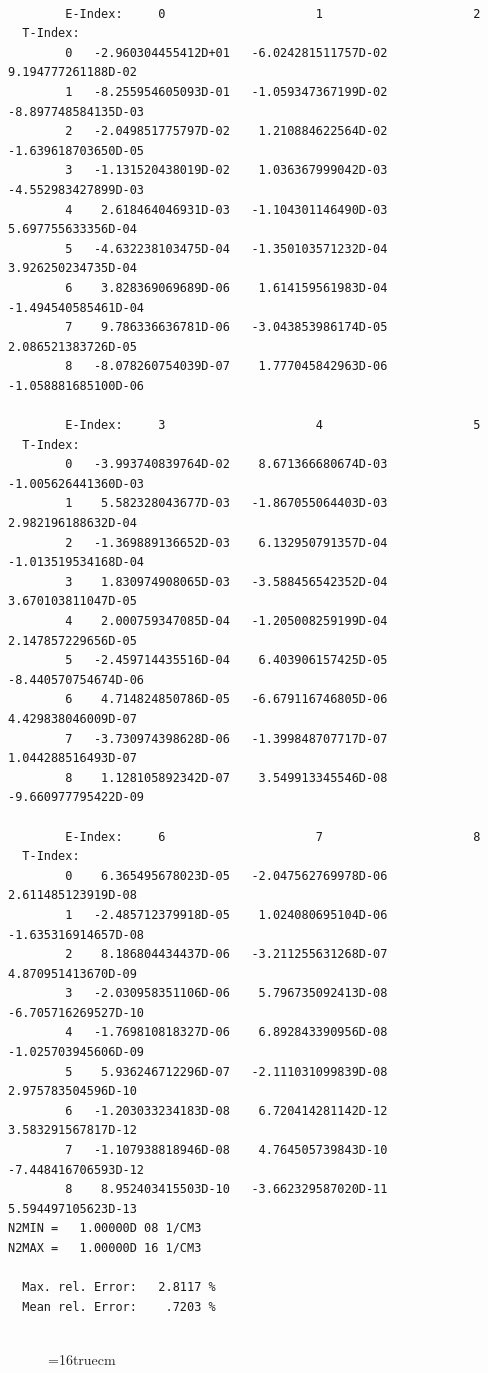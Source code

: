 \documentclass[12pt,dvipdfmx]{article}
\begin{document}
\begin{small}\begin{verbatim}

        E-Index:     0                     1                     2
  T-Index:
        0   -2.960304455412D+01   -6.024281511757D-02    9.194777261188D-02
        1   -8.255954605093D-01   -1.059347367199D-02   -8.897748584135D-03
        2   -2.049851775797D-02    1.210884622564D-02   -1.639618703650D-05
        3   -1.131520438019D-02    1.036367999042D-03   -4.552983427899D-03
        4    2.618464046931D-03   -1.104301146490D-03    5.697755633356D-04
        5   -4.632238103475D-04   -1.350103571232D-04    3.926250234735D-04
        6    3.828369069689D-06    1.614159561983D-04   -1.494540585461D-04
        7    9.786336636781D-06   -3.043853986174D-05    2.086521383726D-05
        8   -8.078260754039D-07    1.777045842963D-06   -1.058881685100D-06

        E-Index:     3                     4                     5
  T-Index:
        0   -3.993740839764D-02    8.671366680674D-03   -1.005626441360D-03
        1    5.582328043677D-03   -1.867055064403D-03    2.982196188632D-04
        2   -1.369889136652D-03    6.132950791357D-04   -1.013519534168D-04
        3    1.830974908065D-03   -3.588456542352D-04    3.670103811047D-05
        4    2.000759347085D-04   -1.205008259199D-04    2.147857229656D-05
        5   -2.459714435516D-04    6.403906157425D-05   -8.440570754674D-06
        6    4.714824850786D-05   -6.679116746805D-06    4.429838046009D-07
        7   -3.730974398628D-06   -1.399848707717D-07    1.044288516493D-07
        8    1.128105892342D-07    3.549913345546D-08   -9.660977795422D-09

        E-Index:     6                     7                     8
  T-Index:
        0    6.365495678023D-05   -2.047562769978D-06    2.611485123919D-08
        1   -2.485712379918D-05    1.024080695104D-06   -1.635316914657D-08
        2    8.186804434437D-06   -3.211255631268D-07    4.870951413670D-09
        3   -2.030958351106D-06    5.796735092413D-08   -6.705716269527D-10
        4   -1.769810818327D-06    6.892843390956D-08   -1.025703945606D-09
        5    5.936246712296D-07   -2.111031099839D-08    2.975783504596D-10
        6   -1.203033234183D-08    6.720414281142D-12    3.583291567817D-12
        7   -1.107938818946D-08    4.764505739843D-10   -7.448416706593D-12
        8    8.952403415503D-10   -3.662329587020D-11    5.594497105623D-13
N2MIN =   1.00000D 08 1/CM3
N2MAX =   1.00000D 16 1/CM3

  Max. rel. Error:   2.8117 %
  Mean rel. Error:    .7203 %


\end{verbatim}\end{small}
\begin{figure} \label{2.1.8c}
\epsfxsize=16truecm
\end{figure}
\newpage
\end{document}
